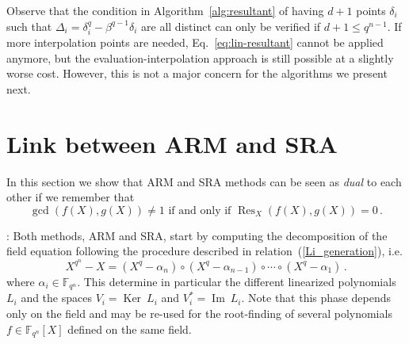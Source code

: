 \documentclass{sig-alternate}
\newcommand{\ff}[1]{\mathbb{F}_{#1}}
\newcommand{\dd}{d}
\newcommand{\qq}{q}
\newcommand{\nn}{n}
\newcommand{\qn}{{\qq^\nn}}
\newcommand{\extf}{\ff{\qn}}
\DeclareMathOperator{\Ker}{Ker}
\DeclareMathOperator{\Ima}{Im}
\DeclareMathOperator{\Res}{Res}
\newcounter{algo}
\begin{document}
Observe that the condition in Algorithm~\ref{alg:resultant} of having
$\dd+1$ points $\delta_i$ such that
$\Delta_i=\delta_i^\qq-\beta^{\qq-1}\delta_i$ are all distinct can
only be verified if $\dd+1\le\qq^{\nn-1}$. If more interpolation
points are needed, Eq.~\eqref{eq:lin-resultant} cannot be applied
anymore, but the evaluation-interpolation approach is still possible
at a slightly worse cost. However, this is not a major concern for the
algorithms we present next.



\section{Link between ARM and SRA}
\label{sec:arm-sra}

In this section we show that ARM and SRA methods can be seen as
\emph{dual} to each other if we remember that
$$\gcd(f(X),g(X)) \ne 1 \mbox{  if and only if }\Res_X(f(X),g(X))=0\,.$$

\medskip

: Both methods, ARM and SRA, start by computing the decomposition of the field equation following the procedure described in relation~(\ref{Li_generation}), i.e.
 $$X^{\qn}-X=(X^\qq - \alpha_\nn) \circ (X^\qq - \alpha_{\nn-1}) \circ \cdots \circ (X^\qq - \alpha_1) \,.$$
where $\alpha_i \in \extf$. This determine in particular the different linearized polynomials $L_i$ and the spaces $V_i=\Ker~L_i$ and $V_i^\ast=\Ima~L_i$. Note that this phase depends only on the field and may be re-used for the root-finding of several polynomials $f \in \extf[X]$ defined on the same field.

\medskip
\end{document}
